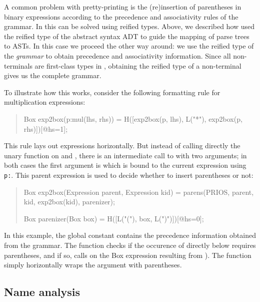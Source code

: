 A common problem with pretty-printing is the (re)insertion of
parentheses in binary expressions according to the precedence and
associativity rules of the grammar. In \Rascal this can be solved
using reified types. Above, we described how  used
the reified type of the abstract syntax ADT to guide the mapping of
parse trees to ASTs. In this case we proceed the other way around: we
use the reified type of the \textit{grammar} to obtain precedence and
associativity information. Since all non-terminals are first-class
types in \Rascal, obtaining the reified type of a non-terminal gives
us the complete grammar. 

To illustrate how this works, consider the following formatting rule
for multiplication expressions:
\begin{quote}
\begin{rascal}
Box exp2box(p:mul(lhs, rhs)) = 
    H([exp2box(p, lhs), L("*"), exp2box(p, rhs)])[@hs=1];
\end{rascal}
\end{quote}
This rule lays out expressions horizontally. But instead of calling
directly the unary function  on  and
, there is an intermediate call to  with
two arguments; in both cases the first argument is  which
is bound to the current expression using \texttt{p:}. This parent
expression is used to decide whether to insert parentheses or not:
\begin{quote}
\begin{rascal}
Box exp2box(Expression parent, Expression kid) =
    parens(PRIOS, parent, kid, exp2box(kid), parenizer);

Box parenizer(Box box) = H([L("("), box, L(")")])[@hs=0];
\end{rascal}
\end{quote}
In this example, the global constant  contains
the precedence information obtained from the grammar. The
 function checks if the occurence of 
directly below  requires parentheses, and if so, calls
 on the Box expression resulting from
). The function  simply
horizontally wraps the argument with parentheses.


\subsection{Name analysis}

